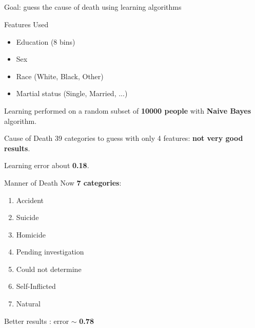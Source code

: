 \documentclass[xcolor=table]{beamer}
\begin{document}
\subsection{}
\begin{frame}
  Goal: guess the cause of death using learning algorithms
\end{frame}

\begin{frame}{Features Used}
\begin{itemize}
  \item Education (8 bins)
  \item Sex
  \item Race (White, Black, Other)
  \item Martial status (Single, Married, ...)
\end{itemize}

\bigskip

Learning performed on a random subset of \textbf{10000 people} with \textbf{Naive Bayes} algorithm.
\end{frame}



\begin{frame}{Cause of Death}
  39 categories to guess with only 4 features: \textbf{not very good results}.
  
  \bigskip
  
  Learning error about \textbf{0.18}.
\end{frame}

\begin{frame}{Manner of Death}
  Now \textbf{7 categories}:
  \begin{enumerate}
    \item Accident
    \item Suicide
    \item Homicide
    \item Pending investigation
    \item Could not determine
    \item Self-Inflicted
    \item Natural
  \end{enumerate}
  
  \bigskip
  
  Better results : error $\sim$ \textbf{0.78}
\end{frame}
\end{document}
